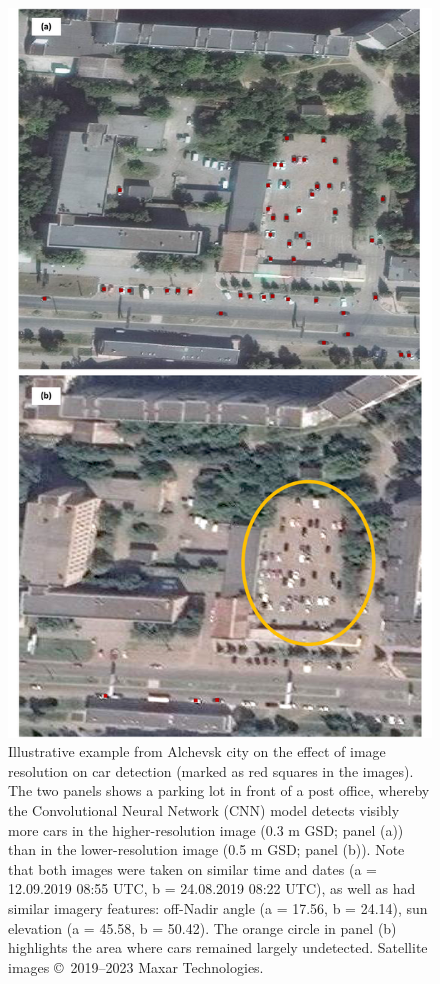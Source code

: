 \documentclass[sn-basic]{sn-jnl}%
\begin{document}
{\begin{appendices}

\begin{figure}[htbp]
\begin{center}
\includegraphics[scale = 0.5]{Figures/Image_Resolution.pdf}
\end{center}
\caption{Illustrative example from Alchevsk city on the effect of image resolution on car detection (marked as red squares in the images). The two panels shows a parking lot in front of a post office, whereby the Convolutional Neural Network (CNN) model detects visibly more cars in the higher-resolution image (0.3 m GSD; panel (a)) than in the lower-resolution image (0.5 m GSD; panel (b)). Note that both images were taken on similar time and dates (a = 12.09.2019 08:55 UTC, b = 24.08.2019 08:22 UTC), as well as had similar imagery features:  off-Nadir angle (a = 17.56\textdegree, b = 24.14\textdegree), sun elevation (a = 45.58\textdegree, b = 50.42\textdegree). The orange circle in panel (b) highlights the area where cars remained largely undetected. Satellite images \copyright ~2019--2023 Maxar Technologies.
}
\label{figSM_ImageResolution}
\end{figure}



\end{appendices}}
\end{document}
